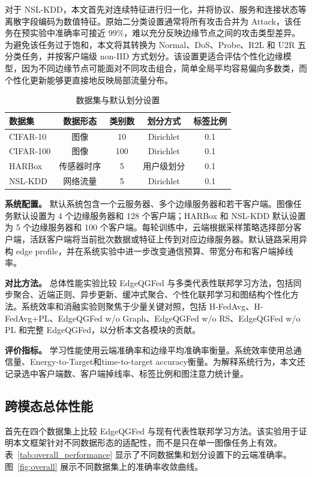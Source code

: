 \documentclass[journal]{IEEEtran}
\begin{document}
对于 NSL-KDD，本文首先对连续特征进行归一化，并将协议、服务和连接状态等离散字段编码为数值特征。原始二分类设置通常将所有攻击合并为 Attack，该任务在预实验中准确率可接近 $99\%$，难以充分反映边缘节点之间的攻击类型差异。为避免该任务过于饱和，本文将其转换为 Normal、DoS、Probe、R2L 和 U2R 五分类任务，并按客户端级 non-IID 方式划分。该设置更适合评估个性化边缘模型，因为不同边缘节点可能面对不同攻击组合，简单全局平均容易偏向多数类，而个性化更新能够更直接地反映局部流量分布。

\begin{table}[t]
\centering
\caption{数据集与默认划分设置}
\label{tab:datasets}
\begin{tabular}{lcccc}
\toprule
数据集 & 数据形态 & 类别数 & 划分方式 & 标签比例 \\
\midrule
 CIFAR-10 & 图像 & 10 & Dirichlet & 0.1 \\
 CIFAR-100 & 图像 & 100 & Dirichlet & 0.1 \\
HARBox & 传感器时序 & 5 & 用户级划分 & 0.1 \\
NSL-KDD & 网络流量 & 5 & Dirichlet & 0.1 \\
\bottomrule
\end{tabular}
\end{table}

\textbf{系统配置。}
默认系统包含一个云服务器、多个边缘服务器和若干客户端。图像任务默认设置为 4 个边缘服务器和 128 个客户端；HARBox 和 NSL-KDD 默认设置为 5 个边缘服务器和 100 个客户端。每轮训练中，云端根据采样策略选择部分客户端，活跃客户端将当前批次数据或特征上传到对应边缘服务器。默认链路采用异构 edge profile，并在系统实验中进一步改变通信预算、带宽分布和客户端掉线率。

\textbf{对比方法。}
总体性能实验比较 EdgeQGFed 与多类代表性联邦学习方法，包括同步聚合、近端正则、异步更新、缓冲式聚合、个性化联邦学习和图结构个性化方法。系统效率和消融实验则聚焦于少量关键对照，包括 H-FedAvg、H-FedAvg+PL、EdgeQGFed w/o Graph、EdgeQGFed w/o RS、EdgeQGFed w/o PL 和完整 EdgeQGFed，以分析本文各模块的贡献。

\textbf{评价指标。}
学习性能使用云端准确率和边缘平均准确率衡量。系统效率使用总通信量、Energy-to-Target和time-to-target accuracy衡量。为解释系统行为，本文还记录选中客户端数、客户端掉线率、标签比例和图注意力统计量。

\subsection{跨模态总体性能}
\label{subsec:overall_performance}

首先在四个数据集上比较 EdgeQGFed 与现有代表性联邦学习方法。该实验用于证明本文框架针对不同数据形态的适配性，而不是只在单一图像任务上有效。表~\ref{tab:overall_performance} 显示了不同数据集和划分设置下的云端准确率。图~\ref{fig:overall} 展示不同数据集上的准确率收敛曲线。
\end{document}
